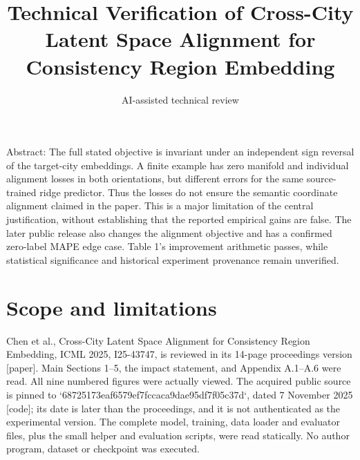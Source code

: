 \documentclass[10pt]{article}
\title{Technical Verification of
Cross-City Latent Space Alignment for Consistency Region Embedding}
\author{AI-assisted technical review}
\date{}
\begin{document}
\maketitle
Abstract: The full stated objective is invariant under an independent sign reversal of the target-city embeddings. A finite example has zero manifold and individual alignment losses in both orientations, but different errors for the same source-trained ridge predictor. Thus the losses do not ensure the semantic coordinate alignment claimed in the paper. This is a major limitation of the central justification, without establishing that the reported empirical gains are false. The later public release also changes the alignment objective and has a confirmed zero-label MAPE edge case. Table 1’s improvement arithmetic passes, while statistical significance and historical experiment provenance remain unverified.\par
\section*{Scope and limitations}
Chen et al., Cross-City Latent Space Alignment for Consistency Region Embedding, ICML 2025, I25-43747, is reviewed in its 14-page proceedings version [paper]. Main Sections 1–5, the impact statement, and Appendix A.1–A.6 were read. All nine numbered figures were actually viewed. The acquired public source is pinned to `68725173eaf6579ef7fccaca9dae95df7f05c37d`, dated 7 November 2025 [code]; its date is later than the proceedings, and it is not authenticated as the experimental version. The complete model, training, data loader and evaluator files, plus the small helper and evaluation scripts, were read statically. No author program, dataset or checkpoint was executed.\par
\end{document}

